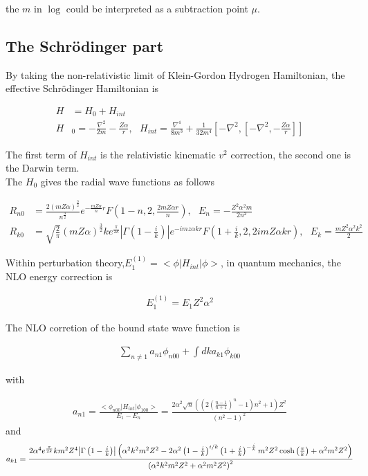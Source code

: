 \documentclass{article}
\begin{document}
the $m$ in $\log$ could be interpreted as a subtraction point $\mu$.

\subsection{The Schr\"odinger part}

By taking the non-relativistic limit of Klein-Gordon Hydrogen Hamiltonian, the effective Schr\"odinger Hamiltonian is

\begin{align}
	H & =H_0+H_{int}                                                                                                                            \\
	H & _0=-\frac{\nabla^2}{2m}-\frac{Z\alpha}{r},\ \ \ H_{int}=\frac{\nabla^4}{8m^3}+\frac{1}{32m^4}[-\nabla^2,[-\nabla^2,-\frac{Z\alpha}{r}]]
\end{align}

The first term of $H_{int}$ is the relativistic kinematic $v^2$ correction, the second one is the Darwin term.\\
The $H_0$ gives the radial wave functions as follows

\begin{align}
	R_{n0} & =\frac{2(mZ\alpha)^\frac{3}{2}}{n^\frac{3}{2}}e^{-\frac{mZ\alpha}{n}r}F(1-n,2,\frac{2mZ\alpha r}{n}),\ \ \ E_n=-\frac{Z^2\alpha^2m}{2n^2}                                \\
	R_{k0} & =\sqrt{\frac{2}{\pi}}(mZ\alpha)^\frac{3}{2}ke^\frac{\pi}{2k}|\Gamma(1-\frac{i}{k})|e^{-imz\alpha kr}F(1+\frac{i}{k},2,2imZ\alpha kr),\ \ \ E_k=\frac{mZ^2\alpha^2k^2}{2}
\end{align}

Within perturbation theory,$E_1^{(1)}=<\phi|H_{int}|\phi>$, in quantum mechanics, the NLO energy correction is

\begin{align}
	E_1^{(1)}=E_1Z^2\alpha^2
\end{align}

The NLO corretion of the bound state wave function is

\begin{align}
	\sum_{n\neq 1}a_{n1}\phi_{n00}+\int dka_{k1}\phi_{k00}
\end{align}

with

\begin{align*}
	a_{n1}=\frac{<\phi_{n00}|H_{int}|\phi_{100}>}{E_1-E_n}=\frac{2 \alpha ^2 \sqrt{n} \left(\left(2 \left(\frac{n-1}{n+1}\right)^n-1\right) n^2+1\right) Z^2}{\left(n^2-1\right)^2}
\end{align*}
and
\begin{align*}
	a_{k1}=\frac{2 \alpha ^4 e^{\frac{\pi }{2 k}} k m^2 Z^4  \abs{\Gamma \left(1-\frac{i}{k}\right)  }\left(\alpha ^2 k^2 m^2 Z^2-2 \alpha ^2 \left(1-\frac{i}{k}\right)^{i/k} \left(1+\frac{i}{k}\right)^{-\frac{i}{k}} m^2 Z^2 \cosh \left(\frac{\pi }{k}\right)+\alpha ^2 m^2 Z^2\right)}{\left(\alpha ^2 k^2 m^2 Z^2+\alpha ^2 m^2 Z^2\right)^2}
\end{align*}
\end{document}
